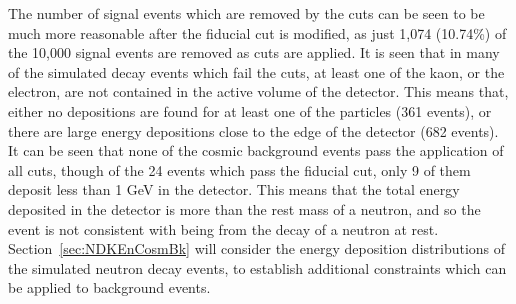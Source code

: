 The number of signal events which are removed by the cuts can be seen to be much more reasonable after the fiducial cut is modified, as just 1,074 (10.74\%) of the 10,000 signal events are removed as cuts are applied. It is seen that in many of the simulated decay events which fail the cuts, at least one of the kaon, or the electron, are not contained in the active volume of the detector. This means that, either no depositions are found for at least one of the particles (361 events), or there are large energy depositions close to the edge of the detector (682 events). \\

It can be seen that none of the cosmic background events pass the application of all cuts, though of the 24 events which pass the fiducial cut, only 9 of them deposit less than 1 GeV in the detector. This means that the total energy deposited in the detector is more than the rest mass of a neutron, and so the event is not consistent with being from the decay of a neutron at rest. Section~\ref{sec:NDKEnCosmBk} will consider the energy deposition distributions of the simulated neutron decay events, to establish additional constraints which can be applied to background events. \\

